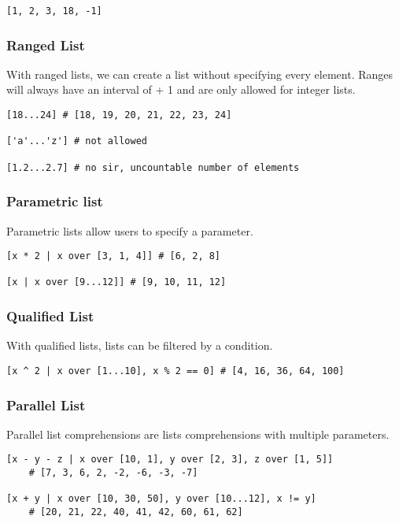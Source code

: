 \documentclass[5pt]{article}
\begin{document}
\begin{lstlisting}[language=rippl]
[1, 2, 3, 18, -1]
\end{lstlisting}


\subsubsection{Ranged List}
With ranged lists, we can create a list without specifying every element. Ranges will always have an interval of + 1 and are only allowed for integer lists. 

\begin{lstlisting}[language=rippl]
[18...24] # [18, 19, 20, 21, 22, 23, 24]

['a'...'z'] # not allowed

[1.2...2.7] # no sir, uncountable number of elements
\end{lstlisting}

\subsubsection{Parametric list}
Parametric lists allow users to specify a parameter.

\begin{lstlisting}[language=rippl]
[x * 2 | x over [3, 1, 4]] # [6, 2, 8] 

[x | x over [9...12]] # [9, 10, 11, 12]
\end{lstlisting}


\subsubsection{Qualified List}
With qualified lists, lists can be filtered by a condition.

\begin{lstlisting}[language=rippl]
[x ^ 2 | x over [1...10], x % 2 == 0] # [4, 16, 36, 64, 100]
\end{lstlisting}


\subsubsection{Parallel List}
Parallel list comprehensions are lists comprehensions with multiple parameters.

\begin{lstlisting}[language=rippl]
[x - y - z | x over [10, 1], y over [2, 3], z over [1, 5]] 
    # [7, 3, 6, 2, -2, -6, -3, -7]
    
[x + y | x over [10, 30, 50], y over [10...12], x != y]
    # [20, 21, 22, 40, 41, 42, 60, 61, 62]
\end{lstlisting}
\end{document}
